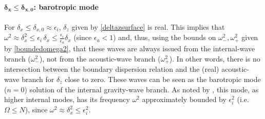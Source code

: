 \paragraph{$\boldsymbol{\delta_x \le \delta_{x,0}}$: barotropic mode}
For $\delta_x \le \delta_{x,0} \approx \epsilon_i$, $\delta_z$ given by \ref{deltazsurface} is real. This implies that $\omega^2 \approx \delta_x^2 \le \epsilon_i\, \delta_x \le \frac{\epsilon_i}{\epsilon_a}\delta_x$ (since $\epsilon_a < 1$) and, thus, using the bounds on $\omega_-^2, \omega_+^2$ given by \ref{boundedomega2}, that these waves are always issued from the internal-wave branch ($\omega_-^2$), not from the acoustic-wave branch ($\omega_+^2$). In other words, there is no intersection between the boundary dispersion relation and the (real) acoustic-wave branch for $\delta_z$ close to zero.
These waves can be seen as the barotropic mode ($n=0$) solution of the internal gravity-wave branch. As noted by \cite{dukowicz_2013}, this mode, as higher internal modes, has its frequency $\omega^2$ approximately bounded by $\epsilon_i^2$ (i.e. $\Omega \le N$), since $\omega^2 \approx \delta_x^2 \le \epsilon_i^2$.
%
